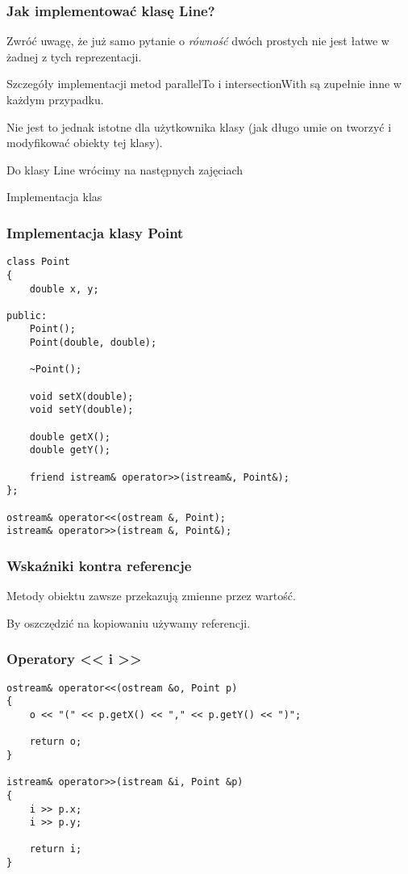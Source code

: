 \documentclass[pdftex, smaller]{beamer}
\begin{document}
\begin{frame}
\frametitle{Jak implementować klasę Line?}

Zwróć uwagę, że już samo pytanie o \emph{równość} dwóch prostych nie jest łatwe w żadnej z tych reprezentacji.

\vspace{4mm}
Szczegóły implementacji metod parallelTo i intersectionWith są zupełnie inne w każdym przypadku.

\vspace{4mm}
Nie jest to jednak istotne dla użytkownika klasy (jak długo umie on tworzyć i modyfikować obiekty tej klasy).

\vspace{4mm}
Do klasy Line wrócimy na następnych zajęciach
\end{frame}


\begin{frame}

\begin{center}
\Large Implementacja klas
\end{center}
\end{frame}

\begin{frame}[fragile]
\frametitle{Implementacja klasy Point}

\begin{lstlisting}
class Point
{
    double x, y;

public:
    Point();
    Point(double, double);

    ~Point();

    void setX(double);
    void setY(double);

    double getX();
    double getY();

    friend istream& operator>>(istream&, Point&);
};

ostream& operator<<(ostream &, Point);
istream& operator>>(istream &, Point&);
\end{lstlisting}
\end{frame}

\begin{frame}
\frametitle{Wskaźniki kontra referencje}

Metody obiektu zawsze przekazują zmienne przez wartość.

\vspace{8mm}
By oszczędzić na kopiowaniu używamy referencji.

\end{frame}

\begin{frame}[fragile]
\frametitle{Operatory << i >>}

\begin{lstlisting}
ostream& operator<<(ostream &o, Point p)
{
    o << "(" << p.getX() << "," << p.getY() << ")";

    return o;
}

istream& operator>>(istream &i, Point &p)
{
    i >> p.x;
    i >> p.y;

    return i;
}
\end{lstlisting}

\end{frame}
\end{document}
